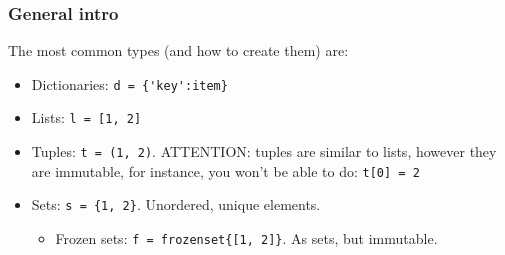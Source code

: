 \documentclass[a4paper,12pt,%
              final%
              ]{article}
\begin{document}
\subsubsection{General intro}
The most common types (and how to create them) are:
\begin{itemize}
  \item Dictionaries: \verb|d = {'key':item}|
  \item Lists: \verb|l = [1, 2]|
  \item Tuples: \verb|t = (1, 2)|. ATTENTION: tuples are similar to lists, however they are immutable, for instance, you won't be able to do: \verb|t[0] = 2|
  \item Sets: \verb|s = {1, 2}|. Unordered, unique elements.
    \begin{itemize}
      \item Frozen sets: \verb|f = frozenset{[1, 2]}|. As sets, but immutable.
    \end{itemize}
\end{itemize}
\end{document}
